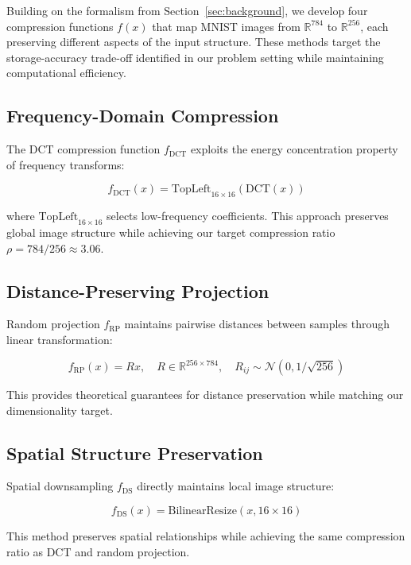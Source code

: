 \documentclass{article} %
\begin{document}
Building on the formalism from Section~\ref{sec:background}, we develop four compression functions $f(x)$ that map MNIST images from $\mathbb{R}^{784}$ to $\mathbb{R}^{256}$, each preserving different aspects of the input structure. These methods target the storage-accuracy trade-off identified in our problem setting while maintaining computational efficiency.

\subsection{Frequency-Domain Compression}
The DCT compression function $f_{\text{DCT}}$ exploits the energy concentration property of frequency transforms:

\begin{equation}
    f_{\text{DCT}}(x) = \text{TopLeft}_{16 \times 16}(\text{DCT}(x))
\end{equation}

where $\text{TopLeft}_{16 \times 16}$ selects low-frequency coefficients. This approach preserves global image structure while achieving our target compression ratio $\rho = 784/256 \approx 3.06$.

\subsection{Distance-Preserving Projection}
Random projection $f_{\text{RP}}$ maintains pairwise distances between samples through linear transformation:

\begin{equation}
    f_{\text{RP}}(x) = Rx, \quad R \in \mathbb{R}^{256 \times 784}, \quad R_{ij} \sim \mathcal{N}(0, 1/\sqrt{256})
\end{equation}

This provides theoretical guarantees for distance preservation while matching our dimensionality target.

\subsection{Spatial Structure Preservation}
Spatial downsampling $f_{\text{DS}}$ directly maintains local image structure:

\begin{equation}
    f_{\text{DS}}(x) = \text{BilinearResize}(x, 16 \times 16)
\end{equation}

This method preserves spatial relationships while achieving the same compression ratio as DCT and random projection.
\end{document}
